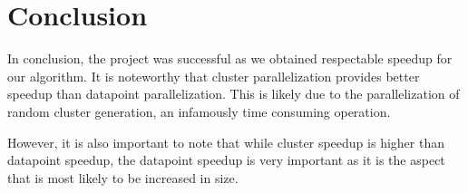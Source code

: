 \documentclass{article}
\begin{document}
\section{Conclusion}
In conclusion, the project was successful as we obtained respectable speedup for our algorithm. It is noteworthy that cluster parallelization provides better speedup than datapoint parallelization. This is likely due to the parallelization of random cluster generation, an infamously time consuming operation.

However, it is also important to note that while cluster speedup is higher than datapoint speedup, the datapoint speedup is very important as it is the aspect that is most likely to be increased in size.
\end{document}
